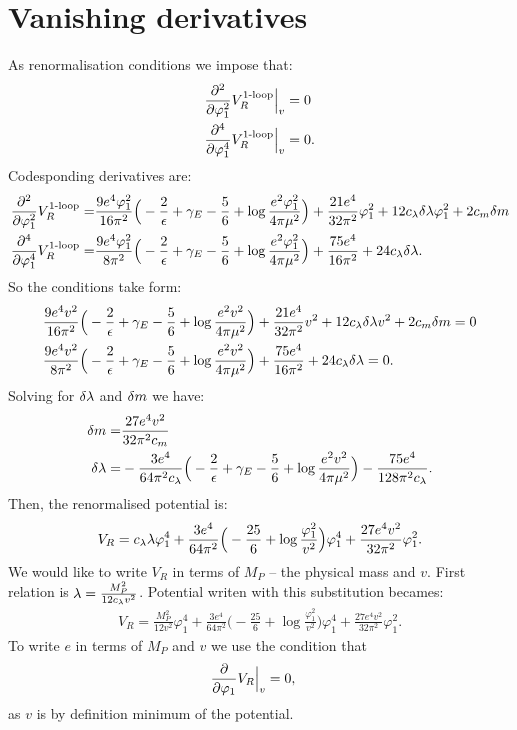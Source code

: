 \section{Vanishing derivatives}
As renormalisation conditions we impose that:
\begin{align}
\frac{\partial^2 }{\partial \varphi_1^2}V_R^{\textrm{1-loop}}\Big|_{v} &= 0 \\
\frac{\partial^4 }{\partial \varphi_1^4}V_R^{\textrm{1-loop}}\Big|_{v} &= 0.
\end{align}
Codesponding derivatives are:
\begin{align}
\frac{\partial^2 }{\partial \varphi_1^2}V_R^{\textrm{1-loop}} = &\frac{9e^4\varphi_1^2}{16\pi^2}\Big(-\frac{2}{\epsilon}+\gamma_E-
\frac{5}{6}+\log{\frac{e^2\varphi_1^2}{4\pi\mu^2}}\Big)+\frac{21e^4}{32\pi^2}\varphi_1^2+ 
12c_\lambda\delta\lambda\varphi_1^2+2c_m\delta m \\
\frac{\partial^4 }{\partial \varphi_1^4}V_R^{\textrm{1-loop}} = &\frac{9e^4\varphi_1^2}{8\pi^2}\Big(-\frac{2}{\epsilon}+\gamma_E-
\frac{5}{6}+\log{\frac{e^2\varphi_1^2}{4\pi\mu^2}}\Big)+\frac{75e^4}{16\pi^2}+24c_\lambda\delta\lambda.
\end{align}
So the conditions take form:
\begin{align}
&\frac{9e^4v^2}{16\pi^2}\Big(-\frac{2}{\epsilon}+\gamma_E-
\frac{5}{6}+\log{\frac{e^2v^2}{4\pi\mu^2}}\Big)+\frac{21e^4}{32\pi^2}v^2+ 
12c_\lambda\delta\lambda v^2+2c_m\delta m = 0\\
&\frac{9e^4v^2}{8\pi^2}\Big(-\frac{2}{\epsilon}+\gamma_E-
\frac{5}{6}+\log{\frac{e^2v^2}{4\pi\mu^2}}\Big)+\frac{75e^4}{16\pi^2}+24c_\lambda\delta\lambda = 0.
\end{align}
Solving for $\delta\lambda$ and $\delta m$ we have:
\begin{align}
\delta m = &\frac{27e^4v^2}{32\pi^2c_m} \\
\delta\lambda = &-\frac{3e^4}{64\pi^2c_\lambda}\Big(-\frac{2}{\epsilon}+\gamma_E-
\frac{5}{6}+\log\frac{e^2v^2}{4\pi\mu^2}\Big)-\frac{75e^4}{128\pi^2c_\lambda}.
\end{align}
Then, the renormalised potential is:
\begin{align}
V_R = c_\lambda\lambda\varphi_1^4 + \frac{3e^4}{64\pi^2}\Big(- 
\frac{25}{6}+\log\frac{\varphi_1^2}{v^2}\Big)\varphi_1^4+
\frac{27e^4v^2}{32\pi^2}\varphi_1^2.
\end{align}
We would like to write $V_R$ in terms of $M_P$ -- the physical mass and $v$.
First relation is $\lambda = \frac{M_P^2}{12c_\lambda v^2}$. Potential writen with this substitution 
becames:
\begin{align}
V_R = \frac{M_P^2}{12v^2}\varphi_1^4 + \frac{3e^4}{64\pi^2}\Big(- \frac{25}{6} + \log
\frac{\varphi_1^2}{v^2}\Big)\varphi_1^4+
\frac{27e^4v^2}{32\pi^2}\varphi_1^2.
\end{align}
To write $e$ in terms of $M_P$ and $v$ we use the condition that 
\begin{align}
\frac{\partial }{\partial \varphi_1}V_R\Big|_{v} &= 0, 
\end{align}
as $v$ is by definition minimum of the potential. \\

